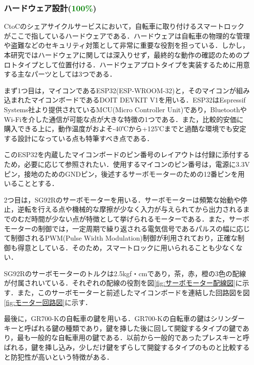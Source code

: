       \subsubsection{ハードウェア設計(\textcolor{green}{100\%})}
        \label{sec:ハードウェア設計}
          \par CtoCのシェアサイクルサービスにおいて，自転車に取り付けるスマートロックがここで指しているハードウェアである．ハードウェアは自転車の物理的な管理や盗難などのセキュリティ対策として非常に重要な役割を担っている．しかし，本研究ではハードウェアに関しては深入りせず，最終的な動作の確認のためのプロトタイプとして位置付ける．ハードウェアプロトタイプを実装するために用意する主なパーツとしては3つである．
          \par まず1つ目は，マイコンであるESP32(ESP-WROOM-32)と，そのマイコンが組み込まれたマイコンボードであるDOIT DEVKIT V1を用いる．ESP32はEspressif Systems社より提供されているMCU(Micro Controller Unit)であり，BluetoothやWi-Fiを介した通信が可能な点が大きな特徴の1つである．また，比較的安価に購入できる上に，動作温度がおよそ-40℃から+125℃までと過酷な環境でも安定する設計になっている点も特筆すべき点である．
          \par このESP32を内蔵したマイコンボードのピン番号のレイアウトは付録に添付するため，必要に応じて参照されたい．使用するマイコンのピン番号は，電源に3.3Vピン，接地のためのGNDピン，後述するサーボモーターのための12番ピンを用いることとする．
          \par 2つ目は，SG92Rのサーボモーターを用いる．サーボモーターは頻繁な始動や停止，逆転を行える点や機械的な摩擦が少なく入力が与えられてから出力されるまでのむだ時間が少ない点が特徴として挙げられるモーターである．また，サーボモーターの制御では，一定周期で繰り返される電気信号であるパルスの幅に応じて制御されるPWM(Pulse Width Modulation)制御が利用されており，正確な制御も得意としている．そのため，スマートロックに用いられることも少なくない．
           \par SG92Rのサーボモーターのトルクは2.5kgf・cmであり，茶，赤，橙の3色の配線が付属されいている．それぞれの配線の役割を図\ref{fig:サーボモーター配線図}に示す．また，このサーボモーターと前述したマイコンボードを連結した回路図を図\ref{fig:モーター回路図}に示す．
           \par 最後に，GR700-Kの自転車の鍵を用いる．GR700-Kの自転車の鍵はシリンダーキーと呼ばれる鍵の種類であり，鍵を挿した後に回して開錠するタイプの鍵であり，最も一般的な自転車用の鍵である．以前から一般的であったプレスキーと呼ばれる，鍵を挿し込み，少しだけ鍵をずらして開錠するタイプのものと比較すると防犯性が高いという特徴がある．
